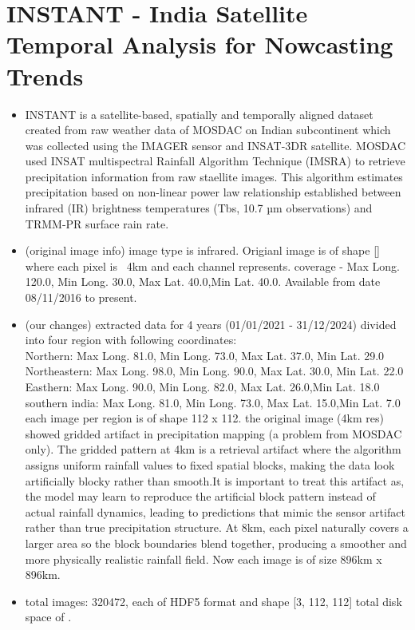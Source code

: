 \documentclass{article}
\begin{document}
\section{INSTANT - India Satellite Temporal Analysis for Nowcasting Trends}
\begin{itemize}
  \item INSTANT is a satellite-based, spatially and temporally aligned dataset created from raw weather data of MOSDAC on Indian subcontinent which was collected using the IMAGER sensor and INSAT-3DR satellite. MOSDAC used INSAT multispectral Rainfall Algorithm Technique (IMSRA) to retrieve precipitation information from raw staellite images. This algorithm estimates precipitation based on non-linear power law relationship established between infrared (IR) brightness temperatures (Tbs, 10.7 µm observations) and TRMM-PR surface rain rate.
  \item (original image info) image type is infrared. Origianl image is of shape []  where each pixel is ~4km and each channel represents. coverage - Max Long.	120.0, Min Long.	30.0, Max Lat.	40.0,Min Lat.	40.0. Available from date 08/11/2016 to present.
  \item (our changes) extracted data for 4 years (01/01/2021 - 31/12/2024) divided into four region with following coordinates:\\
  Northern:  Max Long.	81.0, Min Long.	73.0, Max Lat. 37.0, Min Lat. 29.0\\
  Northeastern:  Max Long.	98.0, Min Long.	90.0, Max Lat. 30.0, Min Lat.	22.0\\
  Easthern:  Max Long.	90.0, Min Long.	82.0, Max Lat.	26.0,Min Lat.	18.0\\
  southern india:  Max Long.	81.0, Min Long.	73.0, Max Lat.	15.0,Min Lat.	7.0\\
  each image per region is of shape 112 x 112. the original image (4km res) showed gridded artifact in precipitation mapping (a problem from MOSDAC only). The gridded pattern at 4km is a retrieval artifact where the algorithm assigns uniform rainfall values to fixed spatial blocks, making the data look artificially blocky rather than smooth.It is important to treat this artifact as, the model may learn to reproduce the artificial block pattern instead of actual rainfall dynamics, leading to predictions that mimic the sensor artifact rather than true precipitation structure. At 8km, each pixel naturally covers a larger area so the block boundaries blend together, producing a smoother and more physically realistic rainfall field. Now each image is of size 896km x 896km.
  \item total images: 320472, each of HDF5 format and shape [3, 112, 112] total disk space of .
\end{itemize}
\end{document}
